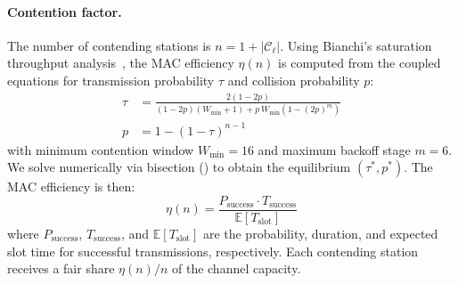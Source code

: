 \documentclass[conference]{IEEEtran}
\begin{document}
\paragraph{Contention factor.}
The number of contending stations is $n = 1 + |\mathcal{C}_\ell|$.  Using
Bianchi's saturation throughput analysis~\cite{bianchi2000}, the MAC
efficiency $\eta(n)$ is computed from the coupled equations for transmission
probability $\tau$ and collision probability $p$:
\begin{align}
\tau &= \frac{2(1 - 2p)}{(1 - 2p)(W_{\min} + 1) + p\,W_{\min}(1 - (2p)^m)} \label{eq:tau} \\
p &= 1 - (1 - \tau)^{n-1} \label{eq:p}
\end{align}
with minimum contention window $W_{\min} = 16$ and maximum backoff stage
$m = 6$.  We solve numerically via bisection
() to obtain the equilibrium $(\tau^*, p^*)$.
The MAC efficiency is then:
\begin{equation}
\eta(n) = \frac{P_\text{success} \cdot T_\text{success}}{\mathbb{E}[T_\text{slot}]}
\label{eq:eta}
\end{equation}
where $P_\text{success}$, $T_\text{success}$, and
$\mathbb{E}[T_\text{slot}]$ are the probability, duration, and expected
slot time for successful transmissions, respectively.  Each contending
station receives a fair share $\eta(n)/n$ of the channel capacity.
\end{document}
